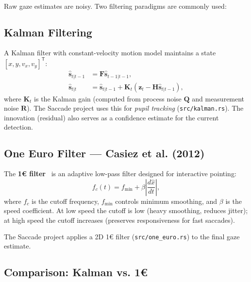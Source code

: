 \documentclass[11pt,a4paper]{article}
\begin{document}
Raw gaze estimates are noisy. Two filtering paradigms are commonly used:

\subsection{Kalman Filtering}

A Kalman filter with constant-velocity motion model maintains a state $[x, y, v_x, v_y]^{\mathsf{T}}$:
\begin{align}
  \hat{\mathbf{s}}_{t|t-1} &= \mathbf{F} \hat{\mathbf{s}}_{t-1|t-1}, \\
  \hat{\mathbf{s}}_{t|t} &= \hat{\mathbf{s}}_{t|t-1} + \mathbf{K}_t (\mathbf{z}_t - \mathbf{H} \hat{\mathbf{s}}_{t|t-1}),
\end{align}
where $\mathbf{K}_t$ is the Kalman gain (computed from process noise $\mathbf{Q}$ and measurement noise $\mathbf{R}$).
The Saccade project uses this for \textit{pupil tracking} (\texttt{src/kalman.rs}).
The innovation (residual) also serves as a confidence estimate for the current detection.

\subsection{One Euro Filter --- Casiez et al. (2012)}

The \textbf{1\euro{} filter}~\cite{casiez2012oef} is an adaptive low-pass filter designed for interactive pointing:
\begin{equation}
  f_c(t) = f_{\min} + \beta \left|\frac{d\hat{x}}{dt}\right|,
\end{equation}
where $f_c$ is the cutoff frequency, $f_{\min}$ controls minimum smoothing, and $\beta$ is the speed coefficient.
At low speed the cutoff is low (heavy smoothing, reduces jitter); at high speed the cutoff increases (preserves responsiveness for fast saccades).

The Saccade project applies a 2D 1\euro{} filter (\texttt{src/one\_euro.rs}) to the final gaze estimate.

\subsection{Comparison: Kalman vs. 1€}
\end{document}
